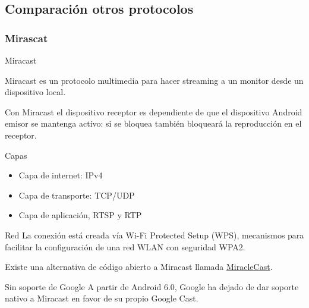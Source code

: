 \subsection{Comparación otros protocolos}

\subsubsection{Mirascat}

\begin{frame}{Miracast}
	\begin{block}{ }
		Miracast es un protocolo multimedia para hacer streaming a un monitor desde un dispositivo local.

		Con Miracast el dispositivo receptor es dependiente de que el dispositivo Android emisor se mantenga activo: si se bloquea también bloqueará la reproducción en el receptor.
	\end{block}
	
	\begin{block}{Capas}
		\begin{itemize}
			\item Capa de internet: IPv4
			\item Capa de transporte: TCP/UDP
			\item Capa de aplicación, RTSP y RTP
		\end{itemize}
	\end{block}
\end{frame}

\begin{frame}
	\begin{block}{Red}
		La conexión está creada vía Wi-Fi Protected Setup
		(WPS), mecanismos para facilitar la configuración de
		una red WLAN con seguridad WPA2.
		
		Existe una alternativa de código abierto a Miracast llamada \href{https://github.com/albfan/miraclecast}{MiracleCast}.
	\end{block}
	
	\begin{alertblock}{Sin soporte de Google}
		A partir de Android 6.0, Google ha dejado de dar soporte nativo a Miracast en favor de su propio Google Cast.
	\end{alertblock}
\end{frame}
